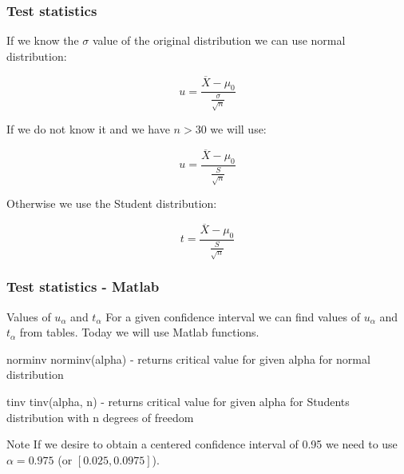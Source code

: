 \documentclass{beamer}
\begin{document}
\begin{frame}
\frametitle{Test statistics}

If we know the $\sigma$ value of the original distribution we can use normal distribution:

\begin{equation*}
u = \frac{\overline{X} - \mu_0}{\frac{\sigma}{\sqrt{n}}}
\end{equation*}

If we do not know it and we have $n > 30$ we will use:

\begin{equation*}
u = \frac{\overline{X} - \mu_0}{\frac{S}{\sqrt{n}}}
\end{equation*}

Otherwise we use the Student distribution:

\begin{equation*}
t = \frac{\overline{X} - \mu_0}{\frac{S}{\sqrt{n}}}
\end{equation*}

\end{frame}


\begin{frame}
\frametitle{Test statistics - Matlab}

\begin{block}{Values of $u_{\alpha}$ and $t_{\alpha}$}
For a given confidence interval we can find values of $u_{\alpha}$ and $t_{\alpha}$ from tables. Today we will use Matlab functions.
\end{block}

\begin{block}{norminv}
norminv(alpha) - returns critical value for given alpha for normal distribution
\end{block}

\begin{block}{tinv}
tinv(alpha, n) - returns critical value for given alpha for Students distribution with n degrees of freedom
\end{block}

\begin{block}{Note}
If we desire to obtain a centered confidence interval of 0.95 we need to use $\alpha = 0.975$ (or $[0.025, 0.0975]$).
\end{block}
\end{frame}
\end{document}
